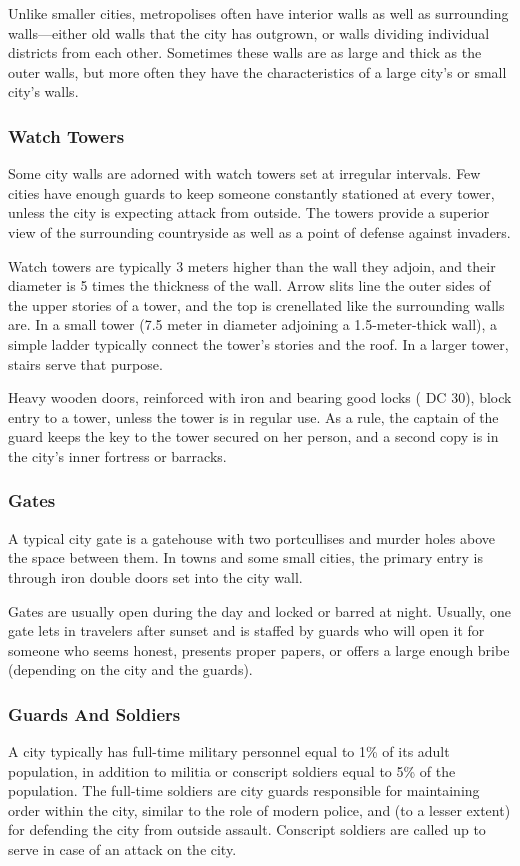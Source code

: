 Unlike smaller cities, metropolises often have interior walls as well as surrounding walls---either old walls that the city has outgrown, or walls dividing individual districts from each other. Sometimes these walls are as large and thick as the outer walls, but more often they have the characteristics of a large city's or small city's walls.

\subsubsection{Watch Towers}
Some city walls are adorned with watch towers set at irregular intervals. Few cities have enough guards to keep someone constantly stationed at every tower, unless the city is expecting attack from outside. The towers provide a superior view of the surrounding countryside as well as a point of defense against invaders.

Watch towers are typically 3 meters higher than the wall they adjoin, and their diameter is 5 times the thickness of the wall. Arrow slits line the outer sides of the upper stories of a tower, and the top is crenellated like the surrounding walls are. In a small tower (7.5 meter in diameter adjoining a 1.5-meter-thick wall), a simple ladder typically connect the tower's stories and the roof. In a larger tower, stairs serve that purpose.

Heavy wooden doors, reinforced with iron and bearing good locks ( DC 30), block entry to a tower, unless the tower is in regular use. As a rule, the captain of the guard keeps the key to the tower secured on her person, and a second copy is in the city's inner fortress or barracks.

\subsubsection{Gates}
A typical city gate is a gatehouse with two portcullises and murder holes above the space between them. In towns and some small cities, the primary entry is through iron double doors set into the city wall.

Gates are usually open during the day and locked or barred at night. Usually, one gate lets in travelers after sunset and is staffed by guards who will open it for someone who seems honest, presents proper papers, or offers a large enough bribe (depending on the city and the guards).

\subsubsection{Guards And Soldiers}
A city typically has full-time military personnel equal to 1\% of its adult population, in addition to militia or conscript soldiers equal to 5\% of the population. The full-time soldiers are city guards responsible for maintaining order within the city, similar to the role of modern police, and (to a lesser extent) for defending the city from outside assault. Conscript soldiers are called up to serve in case of an attack on the city.

